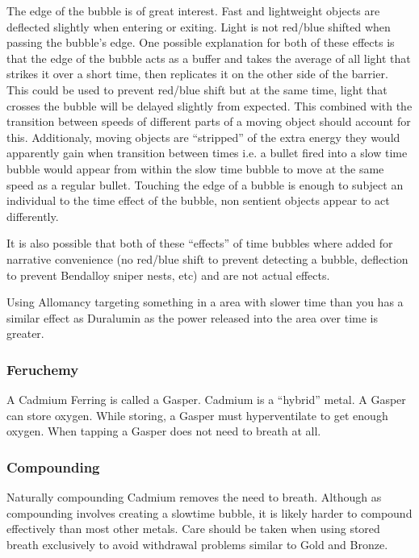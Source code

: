 \documentclass[conference]{IEEEtran}
\begin{document}
The edge of the bubble is of great interest.  Fast and lightweight objects are deflected slightly when entering or exiting.\cite{AoL-CH18}  Light is not red/blue shifted when passing the bubble's edge.\cite{red-blue}  One possible explanation for both of these effects is that the edge of the bubble acts as a buffer and takes the average of all light that strikes it over a short time, then replicates it on the other side of the barrier.  This could be used to prevent red/blue shift but at the same time, light that crosses the bubble will be delayed slightly from expected.  This combined with the transition between speeds of different parts of a moving object should account for this.  Additionaly, moving objects are ``stripped'' of the extra energy they would apparently gain when transition between times i.e. a bullet fired into a slow time bubble would appear from within the slow time bubble to move at the same speed as a regular bullet.\cite{bubble-con}  Touching the edge of a bubble is enough to subject an individual to the time effect of the bubble,\cite{TLM-CH49} non sentient objects appear to act differently.\cite{TLM-CH71}

It is also possible that both of these ``effects'' of time bubbles where added for narrative convenience (no red/blue shift to prevent detecting a bubble, deflection to prevent Bendalloy sniper nests, etc) and are not actual effects.\cite{bubble-con}

Using Allomancy targeting something in a area with slower time than you has a similar effect as Duralumin as the power released into the area over time is greater.  \\
\subsubsection*{\textbf{Feruchemy}}
A Cadmium Ferring is called a Gasper.\cite{ARS}  Cadmium is a ``hybrid'' metal.\cite{FE-TB}  A Gasper can store oxygen.\cite{ARS}  While storing, a Gasper must hyperventilate to get enough oxygen.  When tapping a Gasper does not need to breath at all.
\\
\subsubsection*{\textbf{Compounding}}
Naturally compounding Cadmium removes the need to breath.  Although as compounding involves creating a slowtime bubble, it is likely harder to compound effectively than most other metals.  Care should be taken when using stored breath exclusively to avoid withdrawal problems similar to Gold and Bronze.\cite{AoL-CH13}\cite{TFE-CH38}\\
\end{document}
